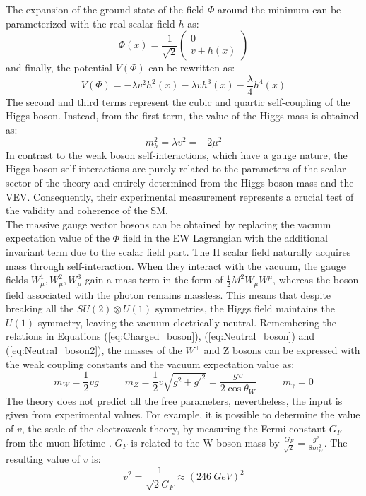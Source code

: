 The expansion of the ground state of the field $\Phi$ around the minimum can be parameterized with the real scalar field $h$ as:
\begin{equation}\label{eq:Higgs_field}
    \Phi(x) = \frac{1}{\sqrt{2}}\begin{pmatrix}
        0 \\
        v + h(x)
    \end{pmatrix}
\end{equation}
and finally, the potential $V(\Phi)$ can be rewritten as:
\begin{equation}
    V(\Phi) = - \lambda v^2 h^2(x) -\lambda vh^3(x) - \frac{\lambda}{4}h^4(x)
\end{equation}
The second and third terms represent the cubic and quartic self-coupling of the Higgs boson. Instead, from the first term, the value of the Higgs mass is obtained as:
\begin{equation}
    m_h^2 = \lambda v^2 = -2\mu^2
\end{equation}
In contrast to the weak boson self-interactions, which have a gauge nature, the Higgs boson self-interactions are purely related to the parameters of the scalar sector of the theory and entirely determined from the Higgs boson mass and the VEV. Consequently, their experimental measurement represents a crucial test of the validity and coherence of the SM.\\
\indent The massive gauge vector bosons can be obtained by replacing the vacuum expectation value of the $\Phi$ field in the EW Lagrangian with the additional invariant term due to the scalar field part. The H scalar field naturally acquires mass through self-interaction. When they interact with the vacuum, the gauge fields $W_\mu^1, W_\mu^2, W_\mu^3 $ gain a mass term in the form of $\frac{1}{2}M^2W_\mu W^\mu$, whereas the boson field associated with the photon remains massless. This means that despite breaking all the $SU(2) \otimes U(1)$ symmetries, the Higgs field maintains the $U(1)$ symmetry, leaving the vacuum electrically neutral. Remembering the relations in Equations (\ref{eq:Charged_boson}), (\ref{eq:Neutral_boson}) and (\ref{eq:Neutral_boson2}), the masses of the $W^\pm$ and Z bosons can be expressed with the weak coupling constants and the vacuum expectation value as:
\begin{equation}
    m_W = \frac{1}{2}vg \: \: \: \: \: \: \: \: \: \: \: \:  m_Z = \frac{1}{2}v\sqrt{g^2 + g'^2} = \frac{gv}{2\cos{\theta_W}} \: \: \: \: \: \: \: \: \: \: \: \: m_\gamma = 0
\end{equation}
The theory does not predict all the free parameters, nevertheless, the input is given from experimental values. For example, it is possible to determine the value of $v$, the scale of the electroweak theory, by measuring the Fermi constant $G_F$ from the muon lifetime \cite{Muon_lifetime}. $G_F$ is related to the W boson mass by $\frac{G_F}{\sqrt{2}} = \frac{g^2}{8m_W^2}$. The resulting value of $v$ is:
\begin{equation}
    v^2 = \frac{1}{\sqrt{2}G_F} \approx (246 \: GeV)^2
\end{equation}



